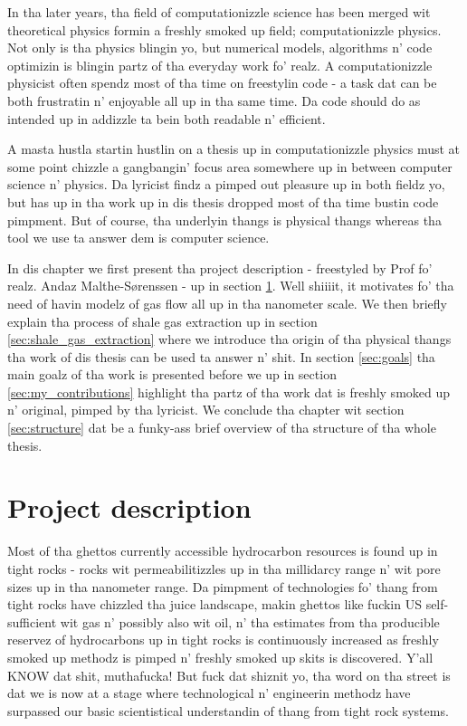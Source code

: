 In tha later years, tha field of computationizzle science has been merged wit theoretical physics formin a freshly smoked up field; computationizzle physics. Not only is tha physics blingin yo, but numerical models, algorithms n' code optimizin is blingin partz of tha everyday work fo' realz. A computationizzle physicist often spendz most of tha time on freestylin code - a task dat can be both frustratin n' enjoyable all up in tha same time. Da code should do as intended up in addizzle ta bein both readable n' efficient.

A masta hustla startin hustlin on a thesis up in computationizzle physics must at some point chizzle a gangbangin' focus area somewhere up in between computer science n' physics. Da lyricist findz a pimped out pleasure up in both fieldz yo, but has up in tha work up in dis thesis dropped most of tha time bustin code pimpment. But of course, tha underlyin thangs is physical thangs whereas tha tool we use ta answer dem is computer science.

In dis chapter we first present tha project description - freestyled by Prof fo' realz. Andaz Malthe-S{\o}renssen - up in section \ref{sec:project_description}. Well shiiiit, it motivates fo' tha need of havin modelz of gas flow all up in tha nanometer scale. We then briefly explain tha process of shale gas extraction up in section \ref{sec:shale_gas_extraction} where we introduce tha origin of tha physical thangs tha work of dis thesis can be used ta answer n' shit. In section \ref{sec:goals} tha main goalz of tha work is presented before we up in section \ref{sec:my_contributions} highlight tha partz of tha work dat is freshly smoked up n' original, pimped by tha lyricist. We conclude tha chapter wit section \ref{sec:structure} dat be a funky-ass brief overview of tha structure of tha whole thesis.

\section{Project description}
\label{sec:project_description}
Most of tha ghettos currently accessible hydrocarbon resources is found up in tight rocks - rocks wit permeabilitizzles up in tha millidarcy range n' wit pore sizes up in tha nanometer range. Da pimpment of technologies fo' thang from tight rocks have chizzled tha juice landscape, makin ghettos like fuckin US self-sufficient wit gas n' possibly also wit oil, n' tha estimates from tha producible reservez of hydrocarbons up in tight rocks is continuously increased as freshly smoked up methodz is pimped n' freshly smoked up skits is discovered. Y'all KNOW dat shit, muthafucka! But fuck dat shiznit yo, tha word on tha street is dat we is now at a stage where technological n' engineerin methodz have surpassed our basic scientistical understandin of thang from tight rock systems.

